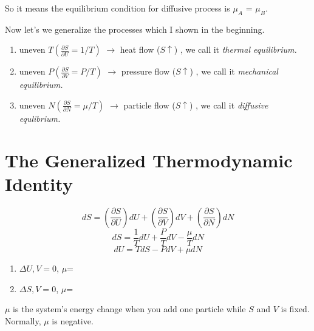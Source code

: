 \documentclass[twoside]{article}
\begin{document}
So it means the equilibrium condition for diffusive process is $\mu_A$ = $\mu_B$.

Now let's we generalize the processes which I shown in the beginning.
\begin{enumerate}
\item uneven $T(\frac {\partial{S}} {\partial{U}} = 1/T)  $ $\rightarrow$ heat     flow ($S\uparrow$) , we call it {\it thermal equilibrium.}
\item uneven $P(\frac {\partial{S}} {\partial{V}} = P/T)  $ $\rightarrow$ pressure flow ($S\uparrow$) , we call it {\it mechanical equilibrium.}
\item uneven $N(\frac {\partial{S}} {\partial{N}} = \mu/T)$ $\rightarrow$ particle flow ($S\uparrow$) , we call it {\it diffusive equlibrium.}
\end{enumerate}

\section{The Generalized Thermodynamic Identity}

\begin{equation} dS = (\frac{\partial S}{\partial U})dU 
                    + (\frac{\partial S}{\partial V})dV  
                    + (\frac{\partial S}{\partial N})dN 
\end{equation}
\begin{equation} dS = \frac{1}{T}dU
                    + \frac{P}{T}dV  
                    - \frac{\mu}{T}dN
\end{equation}
\begin{equation} dU = TdS - PdV  + \mu dN\end{equation}
\begin{enumerate}
\item $\Delta{U,V}=0$, $\mu$=
\item $\Delta{S,V}=0$, $\mu$=
\end{enumerate}
$\mu$ is the system's energy change when you add one particle while $S$ and $V$ is fixed. Normally, $\mu$ is negative.\\
\begin{figure}[h]
\centering
{}
\end{figure}
\end{document}
